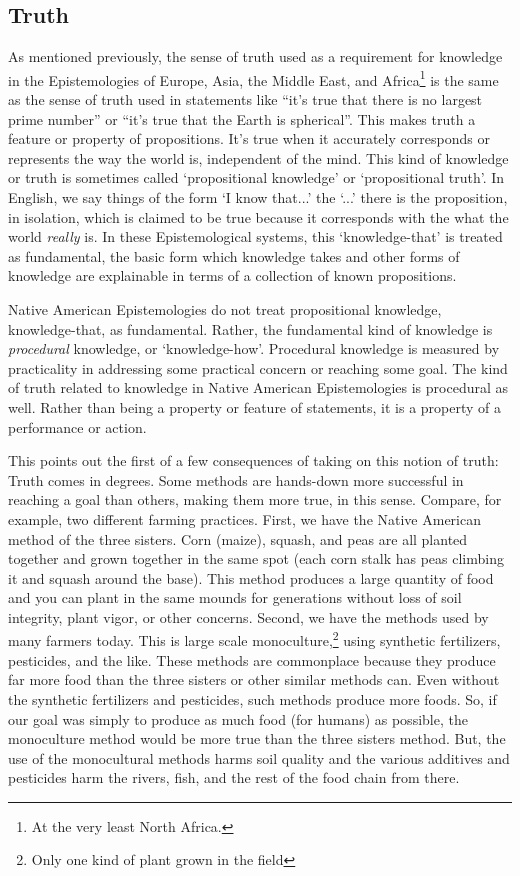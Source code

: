 \subsection{Truth}
As mentioned previously, the sense of truth used as a requirement for knowledge in the Epistemologies of Europe, Asia, the Middle East, and Africa\footnote{At the very least North Africa.} is the same as the sense of truth used in statements like ``it's true that there is no largest prime number'' or ``it's true that the Earth is spherical''.\autocite[57]{NortonSmith1} This makes truth a feature or property of propositions. It's true when it accurately corresponds or represents the way the world is, independent of the mind. This kind of knowledge or truth is sometimes called `propositional knowledge' or `propositional truth'. In English, we say things of the form `I know that...' the `...' there is the proposition, in isolation, which is claimed to be true because it corresponds with the what the world \emph{really} is. In these Epistemological systems, this `knowledge-that' is treated as fundamental, the basic form which knowledge takes and other forms of knowledge are explainable in terms of a collection of known propositions. 

Native American Epistemologies do not treat propositional knowledge, knowledge-that, as fundamental. Rather, the fundamental kind of knowledge is \emph{procedural} knowledge, or `knowledge-how'.\autocite[19]{Burkhart1} Procedural knowledge is measured by practicality in addressing some practical concern or reaching some goal. The kind of truth related to knowledge in Native American Epistemologies is procedural as well. Rather than being a property or feature of statements, it is a property of a performance or action.\autocite[63]{NortonSmith1} 

This points out the first of a few consequences of taking on this notion of truth: Truth comes in degrees. Some methods are hands-down more successful in reaching a goal than others, making them more true, in this sense. Compare, for example, two different farming practices. First, we have the Native American method of the three sisters. Corn (maize), squash, and peas are all planted together and grown together in the same spot (each corn stalk has peas climbing it and squash around the base). This method produces a large quantity of food and you can plant in the same mounds for generations without loss of soil integrity, plant vigor, or other concerns. Second, we have the methods used by many farmers today. This is large scale monoculture,\footnote{Only one kind of plant grown in the field} using synthetic fertilizers, pesticides, and the like. These methods are commonplace because they produce far more food than the three sisters or other similar methods can. Even without the synthetic fertilizers and pesticides, such methods produce more foods. So, if our goal was simply to produce as much food (for humans) as possible, the monoculture method would be more true than the three sisters method. But, the use of the monocultural methods harms soil quality and the various additives and pesticides harm the rivers, fish, and the rest of the food chain from there.\autocite[21-22]{Burkhart1} 

